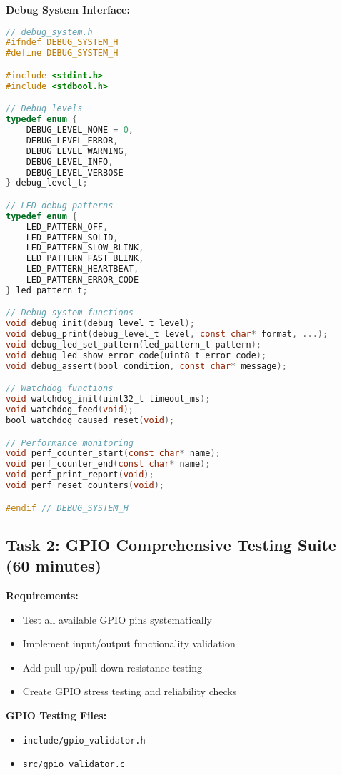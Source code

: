 \documentclass[11pt,a4paper]{article}
\begin{document}
\textbf{Debug System Interface:}
\begin{lstlisting}[language=C]
// debug_system.h
#ifndef DEBUG_SYSTEM_H
#define DEBUG_SYSTEM_H

#include <stdint.h>
#include <stdbool.h>

// Debug levels
typedef enum {
    DEBUG_LEVEL_NONE = 0,
    DEBUG_LEVEL_ERROR,
    DEBUG_LEVEL_WARNING,
    DEBUG_LEVEL_INFO,
    DEBUG_LEVEL_VERBOSE
} debug_level_t;

// LED debug patterns
typedef enum {
    LED_PATTERN_OFF,
    LED_PATTERN_SOLID,
    LED_PATTERN_SLOW_BLINK,
    LED_PATTERN_FAST_BLINK,
    LED_PATTERN_HEARTBEAT,
    LED_PATTERN_ERROR_CODE
} led_pattern_t;

// Debug system functions
void debug_init(debug_level_t level);
void debug_print(debug_level_t level, const char* format, ...);
void debug_led_set_pattern(led_pattern_t pattern);
void debug_led_show_error_code(uint8_t error_code);
void debug_assert(bool condition, const char* message);

// Watchdog functions
void watchdog_init(uint32_t timeout_ms);
void watchdog_feed(void);
bool watchdog_caused_reset(void);

// Performance monitoring
void perf_counter_start(const char* name);
void perf_counter_end(const char* name);
void perf_print_report(void);
void perf_reset_counters(void);

#endif // DEBUG_SYSTEM_H
\end{lstlisting}

\subsection{Task 2: GPIO Comprehensive Testing Suite (60 minutes)}

\textbf{Requirements:}
\begin{itemize}
    \item Test all available GPIO pins systematically
    \item Implement input/output functionality validation
    \item Add pull-up/pull-down resistance testing
    \item Create GPIO stress testing and reliability checks
\end{itemize}

\textbf{GPIO Testing Files:}
\begin{itemize}
    \item \texttt{include/gpio\_validator.h}
    \item \texttt{src/gpio\_validator.c}
\end{itemize}
\end{document}
